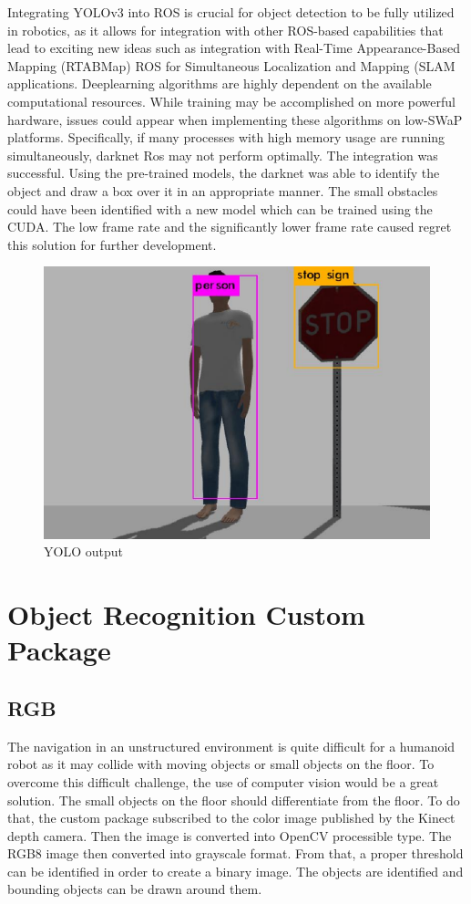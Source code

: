 \documentclass[twoside,12pt,times,onecolumn,a4paper]{report}
\begin{document}
Integrating YOLOv3 into ROS is crucial for object detection to be fully utilized in 
robotics, as it allows for integration with other ROS-based capabilities that lead to exciting 
new ideas such as integration with Real-Time Appearance-Based Mapping 
(RTABMap) ROS for Simultaneous Localization and Mapping (SLAM applications. Deeplearning algorithms are highly dependent on the available computational resources. While 
training may be accomplished on more powerful hardware, issues could appear when 
implementing these algorithms on low-SWaP platforms. Specifically, if many processes 
with high memory usage are running simultaneously, darknet Ros may not perform 
optimally.
The integration was successful. Using the pre-trained models, the darknet was able 
to identify the object and draw a box over it in an appropriate manner. The small obstacles 
could have been identified with a new model which can be trained using the CUDA. The 
low frame rate and the significantly lower frame rate caused regret this solution for further 
development. 

\begin{figure}[H]
  \centering
   \includegraphics[width=12cm]{yolo}
  \caption{YOLO output}
\end{figure}

\section{Object Recognition Custom Package}

\subsection{RGB}

The navigation in an unstructured environment is quite difficult for a humanoid robot 
as it may collide with moving objects or small objects on the floor. To overcome this 
difficult challenge, the use of computer vision would be a great solution. 
The small objects on the floor should differentiate from the floor. To do that, the 
custom package subscribed to the color image published by the Kinect depth camera. 
Then the image is converted into OpenCV processible type. The RGB8 image then 
converted into grayscale format. From that, a proper threshold can be identified in order to 
create a binary image. The objects are identified and bounding objects can be drawn 
around them.
\end{document}
